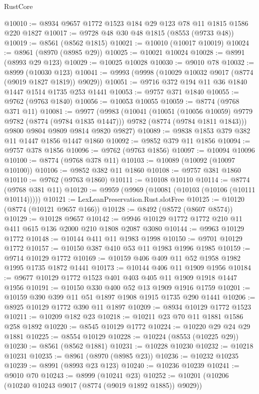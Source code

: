 \begin{lexlean}{RustCore}
\begin{coremodule}
@10010 := @8934 @9657 @1772 @1523 @184 @29 @123 @78 @11 @1815 @1586 @220 @1827
@10017 := @9728 @48 @30 @48 @1815 (@8553 (@9733 @48))
@10019 := @8561 (@8562 @1815)
@10021 := @10010 (@10017 @10019)
@10024 := @8961 (@8970 (@8985 @29))
@10025 := @10021 @10024
@10028 := @8991 (@8993 @29 @123)
@10029 := @10025 @10028
@10030 := @9010 @78
@10032 := @8999 (@10030 @123)
@10041 := @9993 (@9998 (@10029 @10032 @9017 (@8774 (@9019 @1827 @1819)) @9029))
@10051 := @9716 @372 @194 @11 @36 @1840 @1447 @1514 @1735 @253 @1441
@10053 := @9757 @371 @1840
@10055 := @9762 (@9763 @1840)
@10056 := @10053 @10055
@10059 := @8774 (@9768 @371 @11)
@10081 := @9977
    (@9983
      (@10041
        (@10051 (@10056 @10059) @9779 @9782 (@8774 (@9784 @1835 @1447)))
        @9782
        (@8774 (@9784 @1811 @1843)))
      @9800
      @9804
      @9809
      @9814
      @9820
      @9827)
@10089 := @9838 @1853 @379 @382 @11 @1447 @1856 @1447 @1860
@10092 := @9852 @379 @11 @1856
@10094 := @9757 @378 @1856
@10096 := @9762 (@9763 @1856)
@10097 := @10094 @10096
@10100 := @8774 (@9768 @378 @11)
@10103 := @10089 (@10092 (@10097 @10100))
@10106 := @9852 @382 @11 @1860
@10108 := @9757 @381 @1860
@10110 := @9762 (@9763 @1860)
@10111 := @10108 @10110
@10114 := @8774 (@9768 @381 @11)
@10120 := @9959 (@9969 (@10081 (@10103 (@10106 (@10111 @10114)))))
@10121 := LexLeanPreservation.Rust.slotFree
@10125 := @10120 (@8774 (@10121 @9657 @166))
@10128 := @8492 (@8572 (@8607 @8574))
@10129 := @10128 @9657
@10142 := @9946 @10129 @1772 @1772 @210 @11 @411 @615 @136 @2000 @210 @1808 @2087 @3080
@10144 := @9963 @10129 @1772
@10148 := @10144 @411 @11 @1983 @1998
@10150 := @9701 @10129 @1772
@10157 := @10150 @387 @410 @53 @11 @1983 @1996 @1985
@10159 := @9714 @10129 @1772
@10169 := @10159 @406 @409 @11 @52 @1958 @1982 @1995 @1735 @1872 @1441
@10173 := @10144 @406 @11 @1909 @1956
@10184 := @9677 @10129 @1772 @1523 @401 @403 @405 @11 @1909 @1918 @1447 @1956
@10191 := @10150 @330 @400 @52 @13 @1909 @1916 @1759
@10201 := @10159 @390 @399 @11 @51 @1897 @1908 @1915 @1735 @290 @1441
@10206 := @8925 @10129 @1772 @390 @11 @1897
@10209 := @8934 @10129 @1772 @1523
@10211 := @10209 @182 @23
@10218 := @10211 @23 @70 @11 @1881 @1586 @258 @1892
@10220 := @8545 @10129 @1772
@10224 := @10220 @29 @24 @29 @1881
@10225 := @8554 @10129
@10228 := @10224 (@8553 (@10225 @29))
@10230 := @8561 (@8562 @1881)
@10231 := @10228 @10230
@10232 := @10218 @10231
@10235 := @8961 (@8970 (@8985 @23))
@10236 := @10232 @10235
@10239 := @8991 (@8993 @23 @123)
@10240 := @10236 @10239
@10241 := @9010 @70
@10243 := @8999 (@10241 @23)
@10252 := @10201 (@10206 (@10240 @10243 @9017 (@8774 (@9019 @1892 @1885)) @9029))

\end{coremodule}
\end{lexlean}
